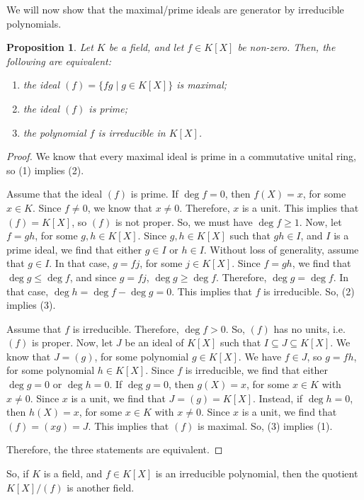 \documentclass[a4paper, openany]{memoir}
\theoremstyle{definition}
\theoremstyle{plain}
\newtheorem{proposition}[definition]{Proposition}
\begin{document}
We will now show that the maximal/prime ideals are generator by irreducible polynomials.
\begin{proposition}
Let $K$ be a field, and let $f \in K[X]$ be non-zero. Then, the following are equivalent:
\begin{enumerate}[label=(\arabic*)]
    \item the ideal $(f) = \{fg \mid g \in K[X]\}$ is maximal;
    \item the ideal $(f)$ is prime;
    \item the polynomial $f$ is irreducible in $K[X]$.
\end{enumerate}
\end{proposition}
\begin{proof}
We know that every maximal ideal is prime in a commutative unital ring, so (1) implies (2). 

\noindent Assume that the ideal $(f)$ is prime. If $\deg f = 0$, then $f(X) = x$, for some $x \in K$. Since $f \neq 0$, we know that $x \neq 0$. Therefore, $x$ is a unit. This implies that $(f) = K[X]$, so $(f)$ is not proper. So, we must have $\deg f \geqslant 1$. Now, let $f = gh$, for some $g, h \in K[X]$. Since $g, h \in K[X]$ such that $gh \in I$, and $I$ is a prime ideal, we find that either $g \in I$ or $h \in I$. Without loss of generality, assume that $g \in I$. In that case, $g = fj$, for some $j \in K[X]$. Since $f = gh$, we find that $\deg g \leqslant \deg f$, and since $g = fj$, $\deg g \geqslant \deg f$. Therefore, $\deg g = \deg f$. In that case, $\deg h = \deg f - \deg g = 0$. This implies that $f$ is irreducible. So, (2) implies (3).

\noindent Assume that $f$ is irreducible. Therefore, $\deg f > 0$. So, $(f)$ has no units, i.e. $(f)$ is proper. Now, let $J$ be an ideal of $K[X]$ such that $I \subseteq J \subseteq K[X]$. We know that $J = (g)$, for some polynomial $g \in K[X]$. We have $f \in J$, so $g = fh$, for some polynomial $h \in K[X]$. Since $f$ is irreducible, we find that either $\deg g = 0$ or $\deg h = 0$. If $\deg g = 0$, then $g(X) = x$, for some $x \in K$ with $x \neq 0$. Since $x$ is a unit, we find that $J = (g) = K[X]$. Instead, if $\deg h = 0$, then $h(X) = x$, for some $x \in K$ with $x \neq 0$. Since $x$ is a unit, we find that $(f) = (xg) = J$. This implies that $(f)$ is maximal. So, (3) implies (1).

\noindent Therefore, the three statements are equivalent.
\end{proof}
\noindent So, if $K$ is a field, and $f \in K[X]$ is an irreducible polynomial, then the quotient $K[X] / (f)$ is another field. 
\end{document}
